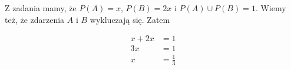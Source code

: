 \medskip
{} 
\medskip

Z zadania mamy, że $P(A) = x$, $P(B) = 2x$ i $P(A) \cup P(B) = 1$.
Wiemy też, że zdarzenia $A$ i $B$ wykluczają się. Zatem

\begin{align*}
x + 2x &= 1 \\
3x &= 1 \\
x &= \frac{1}{3}
\end{align*}